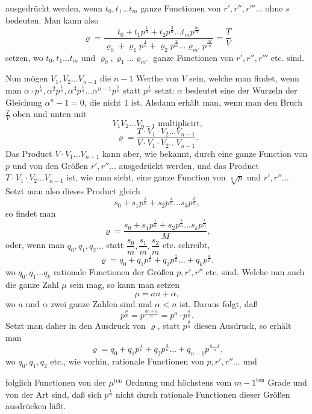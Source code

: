 \documentclass{article}
\begin{document}
ausgedrückt werden, wenn $t_0, t_1 \ldots t_m$ ganze Functionen von $r', r'', r''' \ldots$ ohne $s$ bedeuten. Man kann also
\[ \varrho = \frac{t_0 + t_1 p^{\frac{1}{n}} + t_2 p^{\frac{2}{n}} \ldots t_m p^{\frac{m}{n}}}{\varrho_0 + \varrho_1 p^{\frac{1}{n}} + \varrho_2 p^{\frac{2}{n}} \ldots \varrho_{m'} p^{\frac{m'}{n}}} = \frac{T}{V} \]
setzen, wo $t_0, t_1 \ldots t_m$ und $\varrho_0, \varrho_1 \ldots \varrho_{m'}$ ganze Functionen von $r', r'', r''' $ etc. sind.

Nun mögen $V_1, V_2 \ldots V_{n-1}$ die $n - 1$ Werthe von $V$ sein, welche man findet, wenn man $\alpha \cdot p^{\frac{1}{n}}, \alpha^{2} p^{\frac{1}{n}}, \alpha^{3} p^{\frac{1}{n}} \ldots \alpha^{n-1} p^{\frac{1}{n}}$ statt $p^{\frac{1}{n}}$ setzt: $\alpha$ bedeutet eine der Wurzeln der Gleichung $\alpha^{n} - 1 = 0$, die nicht 1 ist. Alsdann erhält man, wenn man den Bruch $\frac{T}{V}$ oben und unten mit
\[ V_1 V_2 \ldots V_{n-1} \text{ multiplicirt,} \]
\[ \varrho = \frac{T \cdot V_1 \cdot V_2 \ldots V_{n-1}}{V \cdot V_1 \cdot V_2 \ldots V_{n-1}}. \]
Das Product $V \cdot V_1 \ldots V_{n-1}$ kann aber, wie bekannt, durch eine ganze Function von $p$ und von den Größen $r', r'' \ldots$ ausgedrückt werden, und das Product $T \cdot V_1 \cdot V_2 \ldots V_{n-1}$ ist, wie man sieht, eine ganze Function von $\sqrt[n]{p}$ und $r', r'' \ldots$ Setzt man also dieses Product gleich
\[ s_0 + s_1 p^{\frac{1}{n}} + s_2 p^{\frac{2}{n}} \ldots s_k p^{\frac{k}{n}}, \]
so findet man
\[ \varrho = \frac{s_0 + s_1 p^{\frac{1}{n}} + s_2 p^{\frac{2}{n}} \ldots s_k p^{\frac{k}{n}}}{M}, \]
oder, wenn man $q_0, q_1, q_2 \ldots$ statt $\dfrac{s_0}{m}, \dfrac{s_1}{m}, \dfrac{s_2}{m}$ etc. schreibt,
\[ \varrho = q_0 + q_1 p^{\frac{1}{n}} + q_2 p^{\frac{2}{n}} \ldots + q_k p^{\frac{k}{n}}, \]
wo $q_0, q_1 \ldots q_k$ rationale Functionen der Größen $p, r', r'' $ etc. sind. Welche nun auch die ganze Zahl $\mu$ sein mag, so kann man setzen
\[ \mu = an + \alpha, \]
wo $a$ und $\alpha$ zwei ganze Zahlen sind und $\alpha < n$ ist. Daraus folgt, daß
\[ p^{\frac{\mu}{n}} = p^{\frac{an + \alpha}{n}} = p^{a} \cdot p^{\frac{\alpha}{n}}. \]
Setzt man daher in den Ausdruck von $\varrho$, statt $p^{\frac{\mu}{n}}$ diesen Ausdruck, so erhält man
\[ \varrho = q_0 + q_1 p^{\frac{1}{n}} + q_2 p^{\frac{2}{n}} \ldots + q_{n-1} p^{\frac{n-1}{n}}, \]
wo $q_0, q_1, q_2$ etc., wie vorhin, rationale Functionen von $p, r', r'' \ldots$ und

folglich Functionen von der $\mu^{\text{ten}}$ Ordnung und höchstens vom $m - 1^{\text{ten}}$ Grade und von der Art sind, daß sich $p^{\frac{1}{n}}$ nicht durch rationale Functionen dieser Größen ausdrücken läßt.
\end{document}
